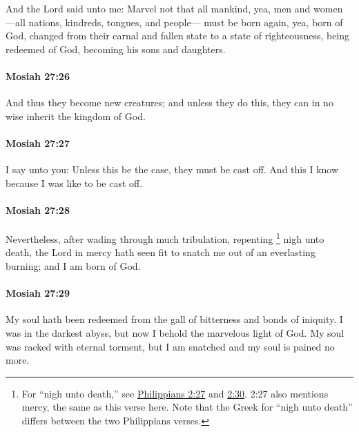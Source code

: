 			And the Lord said unto me:
			Marvel not that all mankind,
			yea, men and women
			---all nations, kindreds, tongues, and people---
			must be born again, yea, born of God,
			changed from their carnal and fallen state to a state of righteousness,
			being redeemed of God,
			becoming his sons and daughters.

		\paragraph{Mosiah 27:26} %
			\label{MOSIAH-27-26}

			And thus they become new creatures;
			and unless they do this, they can in no wise inherit the kingdom of God.

		\paragraph{Mosiah 27:27} %
			\label{MOSIAH-27-27}

			I say unto you:
			Unless this be the case, they must be cast off.
			And this I know because I was like to be cast off.

		\paragraph{Mosiah 27:28} %
			\label{MOSIAH-27-28}

			Nevertheless, after wading through much tribulation,
			repenting
				\footnote{%
					For ``nigh unto death,'' see \hyperref[PHILIPPIANS-2-27]{Philippians 2:27} and \hyperref[PHILIPPIANS-2-30]{2:30}. 2:27 also mentions mercy, the same as this verse here. Note that the Greek for ``nigh unto death'' differs between the two Philippians verses.
					}%
			nigh unto death,
			the Lord in mercy hath seen fit to snatch me out of an everlasting burning;
			and I am born of God.

		\paragraph{Mosiah 27:29} %
			\label{MOSIAH-27-29}

			My soul hath been redeemed from the gall of bitterness and bonds of iniquity.
			I was in the darkest abyss,
			but now I behold the marvelous light of God.
			My soul was racked with eternal torment,
			but I am snatched and my soul is pained no more.

